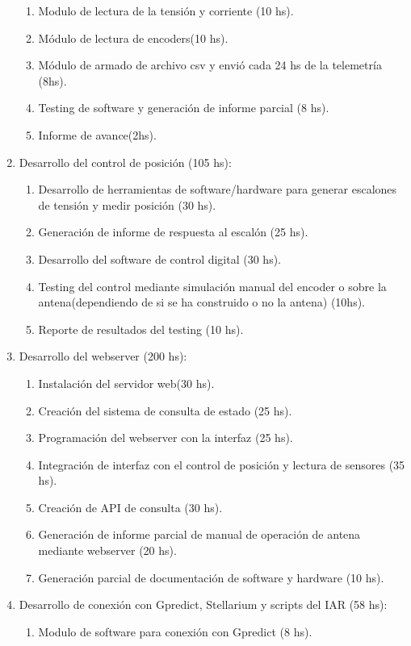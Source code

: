 \documentclass[11pt, %
codirector, %
]{charter}
\begin{document}
\begin{enumerate}
\begin{enumerate}
	\item Modulo de lectura de la tensión y corriente (10 hs). 
	\item Módulo de lectura de encoders(10 hs). 
	\item Módulo de armado de archivo csv y envió cada 24 hs de la telemetría (8hs).
	\item Testing de software y generación de informe parcial (8 hs). 
	\item Informe de avance(2hs). 		
	\end{enumerate}
\item Desarrollo del control de posición (105 hs):  
	\begin{enumerate}
	\item  Desarrollo de herramientas de software/hardware para generar escalones de tensión y medir posición (30 hs). 
	\item  Generación de informe de respuesta al escalón (25 hs). 
	\item  Desarrollo del software de control digital (30 hs).  
	\item  Testing del control mediante simulación manual del encoder o sobre la antena(dependiendo de si se ha construido o no la antena) (10hs).   
	\item  Reporte de resultados del testing (10 hs). 	
\end{enumerate}
\item Desarrollo del webserver (200 hs):  
	\begin{enumerate}
		\item Instalación del servidor web(30 hs).
		\item Creación del sistema de consulta de estado (25 hs). 
		\item Programación del webserver con la interfaz (25 hs). 
		\item Integración de interfaz con el control de posición y lectura de sensores (35 hs). 
		\item Creación de API de consulta (30 hs). 
		\item Generación de informe parcial de manual de operación de antena mediante webserver (20 hs). 
		\item Generación parcial de documentación de software y hardware (10 hs).  
	\end{enumerate}
\item Desarrollo de conexión con Gpredict, Stellarium y scripts del IAR (58 hs):
	\begin{enumerate}
		\item Modulo de software para conexión con Gpredict (8 hs).

\end{enumerate}
\end{enumerate}
\end{document}
